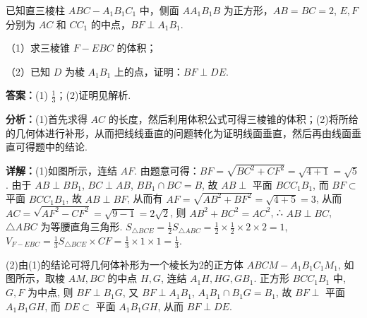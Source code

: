 \begin{question}[points=12]
已知直三棱柱 $ABC-A_1B_1C_1$ 中，侧面 $AA_1B_1B$ 为正方形，$AB=BC=2$, $E, F$ 分别为 $AC$ 和 $CC_1$ 的中点，$BF \perp A_1B_1$.



（1）求三棱锥 $F-EBC$ 的体积；



（2）已知 $D$ 为棱 $A_1B_1$ 上的点，证明：$BF \perp DE$.
\begin{solution}
\textbf{答案：}(1) $\frac{1}{3}$；(2)证明见解析.

\textbf{分析：}(1)首先求得 $AC$ 的长度，然后利用体积公式可得三棱锥的体积；(2)将所给的几何体进行补形，从而把线线垂直的问题转化为证明线面垂直，然后再由线面垂直可得题中的结论.

\textbf{详解：}(1)如图所示，连结 $AF$. 由题意可得：$BF = \sqrt{BC^2 + CF^2} = \sqrt{4+1} = \sqrt{5}$. 由于 $AB \perp BB_1$, $BC \perp AB$, $BB_1 \cap BC = B$, 故 $AB \perp$ 平面 $BCC_1B_1$, 而 $BF \subset$ 平面 $BCC_1B_1$, 故 $AB \perp BF$, 从而有 $AF = \sqrt{AB^2 + BF^2} = \sqrt{4+5} = 3$, 从而 $AC = \sqrt{AF^2 - CF^2} = \sqrt{9-1} = 2\sqrt{2}$, 则 $AB^2 + BC^2 = AC^2$, ∴ $AB \perp BC$, $\triangle ABC$ 为等腰直角三角形. $S_{\triangle BCE} = \frac{1}{2} S_{\triangle ABC} = \frac{1}{2} \times \frac{1}{2} \times 2 \times 2 = 1$, $V_{F-EBC} = \frac{1}{3} S_{\triangle BCE} \times CF = \frac{1}{3} \times 1 \times 1 = \frac{1}{3}$.

(2)由(1)的结论可将几何体补形为一个棱长为2的正方体 $ABCM-A_1B_1C_1M_1$, 如图所示，取棱 $AM, BC$ 的中点 $H, G$, 连结 $A_1H, HG, GB_1$. 正方形 $BCC_1B_1$ 中, $G, F$ 为中点, 则 $BF \perp B_1G$, 又 $BF \perp A_1B_1$, $A_1B_1 \cap B_1G = B_1$, 故 $BF \perp$ 平面 $A_1B_1GH$, 而 $DE \subset$ 平面 $A_1B_1GH$, 从而 $BF \perp DE$.
\end{solution}
\end{question}

